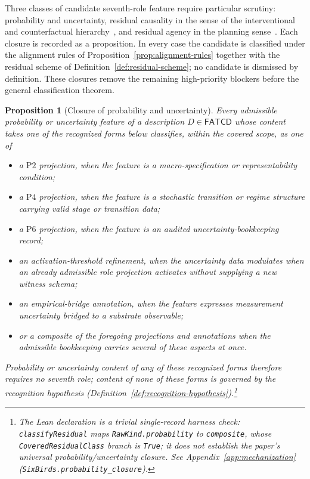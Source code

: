 \documentclass[11pt]{article}
\newtheorem{proposition}[theorem]{Proposition}
\theoremstyle{definition}
\newcommand{\FATCD}{\ensuremath{\mathsf{FATCD}}}
\newcommand{\Ptwo}{\ensuremath{\mathrm{P2}}}
\newcommand{\Pfour}{\ensuremath{\mathrm{P4}}}
\newcommand{\Psix}{\ensuremath{\mathrm{P6}}}
\begin{document}
Three classes of candidate seventh-role feature require particular
scrutiny: probability and uncertainty, residual causality in the
sense of the interventional and counterfactual
hierarchy~\citep{Pearl2009}, and residual agency in the planning
sense~\citep{Bratman1987}. Each closure is recorded as a proposition.
In every case the candidate is classified under the alignment rules
of Proposition~\ref{prop:alignment-rules} together with the residual
scheme of Definition~\ref{def:residual-scheme}; no candidate is
dismissed by definition. These closures remove the remaining
high-priority blockers before the general classification theorem.

\begin{proposition}[Closure of probability and uncertainty]\label{prop:probability-closure}
Every admissible probability or uncertainty feature of a description
\(D \in \FATCD{}\) whose content takes one of the recognized forms below
classifies, within the covered scope, as one of
\begin{itemize}[topsep=2pt,itemsep=1pt]
  \item a \Ptwo{} projection, when the feature is a macro-specification
    or representability condition;
  \item a \Pfour{} projection, when the feature is a stochastic
    transition or regime structure carrying valid stage or transition
    data;
  \item a \Psix{} projection, when the feature is an audited
    uncertainty-bookkeeping record;
  \item an activation-threshold refinement, when the uncertainty data
    modulates when an already admissible role projection activates
    without supplying a new witness schema;
  \item an empirical-bridge annotation, when the feature expresses
    measurement uncertainty bridged to a substrate observable;
  \item or a composite of the foregoing projections and annotations when
    the admissible bookkeeping carries several of these aspects at once.
\end{itemize}
Probability or uncertainty content of any of these recognized forms therefore
requires no seventh role; content of none of these forms is governed by the
recognition hypothesis (Definition~\ref{def:recognition-hypothesis}).\footnote{The Lean declaration is a trivial single-record harness check: \texttt{classifyResidual} maps \texttt{RawKind.probability} to \texttt{composite}, whose \texttt{CoveredResidualClass} branch is \texttt{True}; it does not establish the paper's universal probability/uncertainty closure. See Appendix~\ref{app:mechanization} (\texttt{SixBirds.probability\_closure}).}
\end{proposition}
\end{document}
